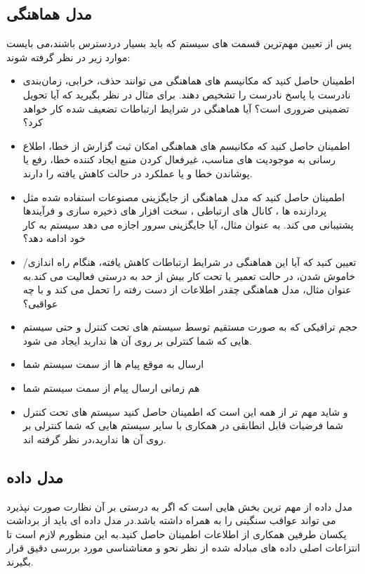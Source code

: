 \begin{itemize}
\subsection{مدل هماهنگی}
پس از تعیین مهم‌ترین قسمت های سیستم که باید بسیار در‌دسترس باشند،می بایست موارد زیر در نظر گرفته شوند:
\begin{itemize}
\item
اطمینان حاصل کنید که مکانیسم های هماهنگی می توانند حذف، خرابی، زمان‌بندی نادرست یا پاسخ نادرست را تشخیص دهند. برای مثال در نظر بگیرید که آیا تحویل تضمینی ضروری است؟ آیا هماهنگی در شرایط ارتباطات تضعیف شده کار خواهد کرد؟
\item
اطمینان حاصل کنید که مکانیسم های هماهنگی امکان ثبت گزارش از خطا، اطلاع رسانی به موجودیت های مناسب، غیرفعال کردن منبع ایجاد کننده خطا، رفع یا پوشاندن خطا و یا عملکرد در حالت کاهش یافته را دارند.
\item
اطمینان حاصل کنید که مدل هماهنگی از جایگزینی مصنوعات استفاده شده مثل پردازنده ها ، کانال های ارتباطی ، سخت افزار های ذخیره سازی و فرآیندها پشتیبانی می کند. به عنوان مثال، آیا جایگزینی سرور اجازه می دهد سیستم به کار خود ادامه دهد؟
\item
تعیین کنید که آیا این هماهنگی در شرایط ارتباطات کاهش یافته، هنگام راه اندازی/ خاموش شدن، در حالت تعمیر یا تحت کار بیش از حد به درستی فعالیت می کند.به عنوان مثال، مدل هماهنگی چقدر اطلاعات از دست رفته را تحمل می کند و با چه عواقبی؟
\end{itemize}
\begin{itemize}
\item
حجم ترافیکی که به صورت مستقیم توسط سیستم های تحت کنترل و حتی سیستم هایی که شما کنترلی بر روی آن ها ندارید ایجاد می شود.
\item
ارسال به موقع پیام ها از سمت سیستم شما
\item
هم زمانی ارسال پیام از سمت سیستم شما
\item
و شاید مهم تر از همه این است که اطمینان حاصل کنید سیستم های تحت کنترل شما فرضیات قابل انطابقی در همکاری با سایر سیستم هایی که شما کنترلی بر روی آن ها ندارید،‌در نظر گرفته اند.
\end{itemize}
\subsection{مدل داده}
مدل داده  از مهم ترین بخش هایی است که اگر به درستی بر آن نظارت صورت نپذیرد می تواند عواقب سنگینی را به همراه داشته باشد.در مدل داده ای باید از برداشت یکسان طرفین همکاری از اطلاعات اطمینان حاصل کنید.به این منظورم لازم است تا انتزاعات اصلی داده های مبادله شده از نظر نحو و معناشناسی مورد بررسی دقیق قرار بگیرند.

\end{itemize}
